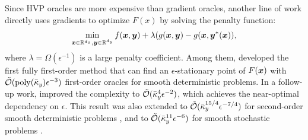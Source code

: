 \documentclass{article}
\begin{document}
Since HVP oracles are more expensive than gradient oracles,
another line of work
\citep{liu2020generic,liu2021value,liu2021towards,liu2022bome, kwon2023fully,shen2023penalty,lu2024first,pan2024scalebio}
directly uses gradients to optimize $F(x)$ by solving the penalty function:
\begin{align} \label{eq:Lag}
   \min_{{\bm{x}} \in {\mathbb{R}}^{d_x}, {\bm{y}} \in {\mathbb{R}}^{d_y}}  f({\bm{x}},{\bm{y}}) + \lambda (g({\bm{x}},{\bm{y}}) - g({\bm{x}},{\bm{y}}^*({\bm{x}})),
\end{align}
where $\lambda = \Omega(\epsilon^{-1})$ is a large penalty coefficient.
Among them, 
\citet{kwon2023fully} 
developed the first fully first-order method that can find an $\epsilon$-stationary point of $F({\bm{x}})$ with $\tilde {{\mathcal{O}}}({\rm poly}(\bar \kappa_y) \epsilon^{-3})$ first-order oracles for smooth deterministic problems.
In a follow-up work, \citet{chen2023near} improved the complexity to $\tilde {{\mathcal{O}}}(\bar \kappa_y^{4} \epsilon^{-2})$, which achieves the near-optimal dependency on $\epsilon$. This result was also extended to $\tilde {{\mathcal{O}}}(\bar \kappa_y^{15/4} \epsilon^{-7/4})$ for second-order smooth deterministic problems \citep{chen2023near}, and to $\tilde {{\mathcal{O}}}(\bar \kappa_y^{11} \epsilon^{-6})$ for smooth stochastic problems \citep{kwon2024complexity,chen2023near}.
\end{document}
